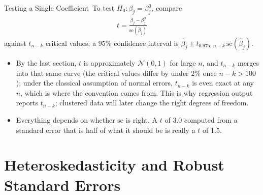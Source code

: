 \documentclass[aspectratio=169,11pt,xcolor=dvipsnames]{beamer}
\newcommand{\SE}{\mathrm{se}}
\newcommand{\core}{\,\raisebox{0.6pt}{\textcolor{corestar}{$\bigstar$}}}
\begin{document}
\begin{frame}{Testing a Single Coefficient\core}
To test $H_0: \beta_j = \beta_j^0$, compare
\begin{align*}
  t = \frac{\hat\beta_j - \beta_j^0}{\SE(\hat\beta_j)}
\end{align*}
against $t_{n-k}$ critical values; a $95\%$ confidence interval is
$\hat\beta_j \pm t_{0.975,\,n-k}\,\SE(\hat\beta_j)$.
\vskip6pt
\begin{itemize}\itemsep4pt
  \item By the last section, $t$ is approximately $\mathcal N(0,1)$ for
        large $n$, and $t_{n-k}$ merges into that same curve (the critical
        values differ by under $2\%$ once $n-k > 100$); under the classical
        assumption of normal errors, $t_{n-k}$ is even exact at any $n$,
        which is where the convention comes from. This is why regression
        output reports $t_{n-k}$; clustered data will later change the
        right degrees of freedom.
  \item \alert{Everything depends on whether $\SE$ is right.} A $t$ of 3.0
        computed from a standard error that is half of what it should be is
        really a $t$ of 1.5.
\end{itemize}
\end{frame}

\section[Heteroskedasticity]{Heteroskedasticity and Robust Standard Errors}
\begin{frame}\sectionpage\end{frame}
\end{document}
